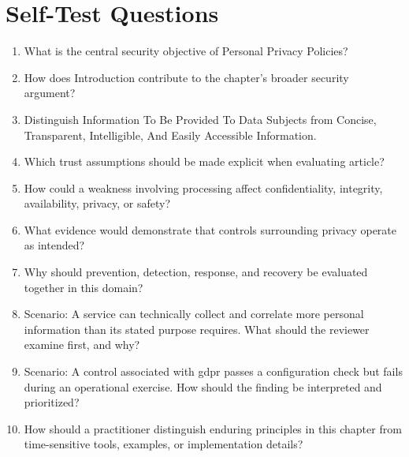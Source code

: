 \documentclass[11pt]{article}
\begin{document}
\section*{Self-Test Questions}
\begin{enumerate}
\item What is the central security objective of Personal Privacy Policies?
\item How does Introduction contribute to the chapter's broader security argument?
\item Distinguish Information To Be Provided To Data Subjects from Concise, Transparent, Intelligible, And Easily Accessible Information.
\item Which trust assumptions should be made explicit when evaluating article?
\item How could a weakness involving processing affect confidentiality, integrity, availability, privacy, or safety?
\item What evidence would demonstrate that controls surrounding privacy operate as intended?
\item Why should prevention, detection, response, and recovery be evaluated together in this domain?
\item Scenario: A service can technically collect and correlate more personal information than its stated purpose requires. What should the reviewer examine first, and why?
\item Scenario: A control associated with gdpr passes a configuration check but fails during an operational exercise. How should the finding be interpreted and prioritized?
\item How should a practitioner distinguish enduring principles in this chapter from time-sensitive tools, examples, or implementation details?
\end{enumerate}
\end{document}
